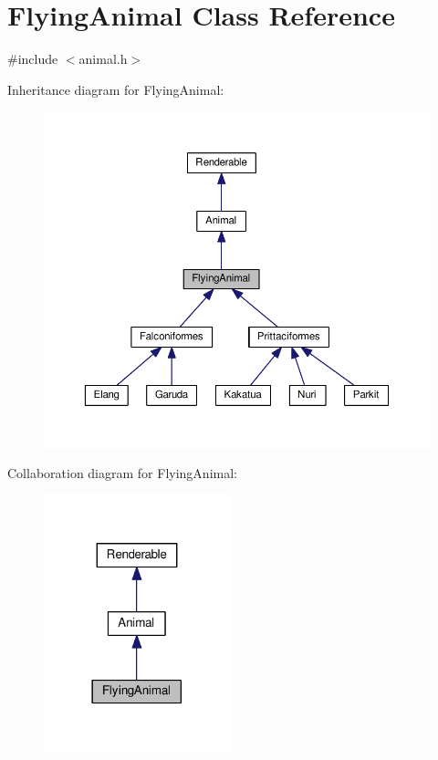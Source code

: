 \hypertarget{classFlyingAnimal}{}\section{Flying\+Animal Class Reference}
\label{classFlyingAnimal}


{\ttfamily \#include $<$animal.\+h$>$}



Inheritance diagram for Flying\+Animal\+:
\nopagebreak
\begin{figure}[H]
\begin{center}
\leavevmode
\includegraphics[width=350pt]{classFlyingAnimal__inherit__graph}
\end{center}
\end{figure}


Collaboration diagram for Flying\+Animal\+:
\nopagebreak
\begin{figure}[H]
\begin{center}
\leavevmode
\includegraphics[width=153pt]{classFlyingAnimal__coll__graph}
\end{center}
\end{figure}
